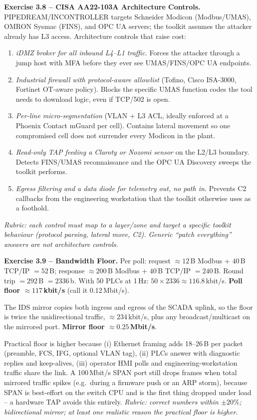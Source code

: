 \documentclass[11pt,a4paper]{article}
\begin{document}
\begin{solutionbox}
\textbf{Exercise 3.8 -- CISA AA22-103A Architecture Controls.}
PIPEDREAM/INCONTROLLER targets Schneider Modicon (Modbus/UMAS), OMRON Sysmac (FINS), and OPC UA servers; the toolkit assumes the attacker already has L3 access. Architecture controls that raise cost:
\begin{enumerate}\setlength{\itemsep}{1pt}
  \item \emph{iDMZ broker for all inbound L4--L1 traffic.} Forces the attacker through a jump host with MFA before they ever see UMAS/FINS/OPC UA endpoints.
  \item \emph{Industrial firewall with protocol-aware allowlist} (Tofino, Cisco ISA-3000, Fortinet OT-aware policy). Blocks the specific UMAS function codes the tool needs to download logic, even if TCP/502 is open.
  \item \emph{Per-line micro-segmentation} (VLAN + L3 ACL, ideally enforced at a Phoenix Contact mGuard per cell). Contains lateral movement so one compromised cell does not surrender every Modicon in the plant.
  \item \emph{Read-only TAP feeding a Claroty or Nozomi sensor} on the L2/L3 boundary. Detects FINS/UMAS reconnaissance and the OPC UA Discovery sweeps the toolkit performs.
  \item \emph{Egress filtering and a data diode for telemetry out, no path in.} Prevents C2 callbacks from the engineering workstation that the toolkit otherwise uses as a foothold.
\end{enumerate}
\emph{Rubric: each control must map to a layer/zone and target a specific toolkit behaviour (protocol parsing, lateral move, C2). Generic ``patch everything'' answers are not architecture controls.}
\end{solutionbox}

\begin{solutionbox}
\textbf{Exercise 3.9 -- Bandwidth Floor.}
Per poll: request $\approx 12$\,B Modbus + $40$\,B TCP/IP $= 52$\,B; response $\approx 200$\,B Modbus + $40$\,B TCP/IP $= 240$\,B. Round trip $= 292$\,B $= 2336$\,b. With 50 PLCs at 1\,Hz: $50 \times 2336 \approx 116.8$\,kbit/s. \textbf{Poll floor $\approx 117$\,kbit/s} (call it 0.12\,Mbit/s).

The IDS mirror copies both ingress and egress of the SCADA uplink, so the floor is twice the unidirectional traffic, $\approx 234$\,kbit/s, plus any broadcast/multicast on the mirrored port. \textbf{Mirror floor $\approx 0.25$\,Mbit/s}.

Practical floor is higher because (i) Ethernet framing adds 18--26\,B per packet (preamble, FCS, IFG, optional VLAN tag), (ii) PLCs answer with diagnostic replies and keep-alives, (iii) operator HMI polls and engineering-workstation traffic share the link. A 100\,Mbit/s SPAN port still drops frames when total mirrored traffic spikes (e.g.\ during a firmware push or an ARP storm), because SPAN is best-effort on the switch CPU and is the first thing dropped under load -- a hardware TAP avoids this entirely. \emph{Rubric: correct numbers within $\pm 20\%$; bidirectional mirror; at least one realistic reason the practical floor is higher.}
\end{solutionbox}
\end{document}
